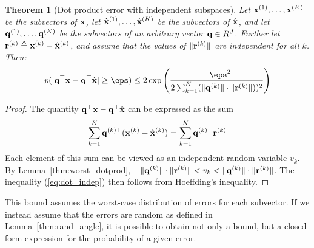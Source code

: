 \documentclass[]{article}
\newtheorem{theorem}{Theorem}[section]
\begin{document}
\begin{theorem}[Dot product error with independent subspaces] \label{thm:dot_indep}
Let $\mathbf{x}^{(1)},\ldots,\mathbf{x}^{(K)}$ be the subvectors of $\mathbf{x}$, let $\hat{\mathbf{x}}^{(1)},\ldots,\hat{\mathbf{x}}^{(K)}$ be the subvectors of $\hat{\mathbf{x}}$, and let $\mathbf{q}^{(1)},\ldots,\mathbf{q}^{(K)}$ be the subvectors of an arbitrary vector $\mathbf{q} \in R^J$. Further let $\mathbf{r}^{(k)} \triangleq \mathbf{x}^{(k)} - \hat{\mathbf{x}}^{(k)}$, and assume that the values of $\lVert \mathbf{r}^{(k)} \rVert$ are independent for all $k$. Then: %
\begin{align} \label{eq:dot_indep}
    p(\abs{\q^\top \x - \q^\top \xhat} \ge \eps) \le 2\exp \left( \frac{-\eps^2}{
        2 \sum_{k=1}^K (\norm{\q^{(k)}} \cdot \norm{ \r^{(k)} }))^2
    }\right)
\end{align}
\end{theorem}

\begin{proof}
The quantity $\mathbf{q}^\top \mathbf{x} - \mathbf{q}^\top \hat{\mathbf{x}}$ can be expressed as the sum
\begin{align}
    \sum_{k=1}^K \mathbf{q}^{(k)\top} (\mathbf{x}^{(k)} - \hat{\mathbf{x}}^{(k)}) = \sum_{k=1}^K \mathbf{q}^{(k)\top} \mathbf{r}^{(k)}
\end{align}
Each element of this sum can be viewed as an independent random variable $v_k$. By Lemma~\ref{thm:worst_dotprod}, $-\lVert\mathbf{q}^{(k)}\rVert \cdot \lVert\mathbf{r}^{(k)}\rVert < v_k < \lVert\mathbf{q}^{(k)}\rVert \cdot \lVert\mathbf{r}^{(k)}\rVert$. The inequality (\ref{eq:dot_indep}) then follows from Hoeffding's inequality.
\end{proof}

This bound assumes the worst-case distribution of errors for each subvector. If we instead assume that the errors are random as defined in Lemma~\ref{thm:rand_angle}, it is possible to obtain not only a bound, but a closed-form expression for the probability of a given error.
\end{document}
